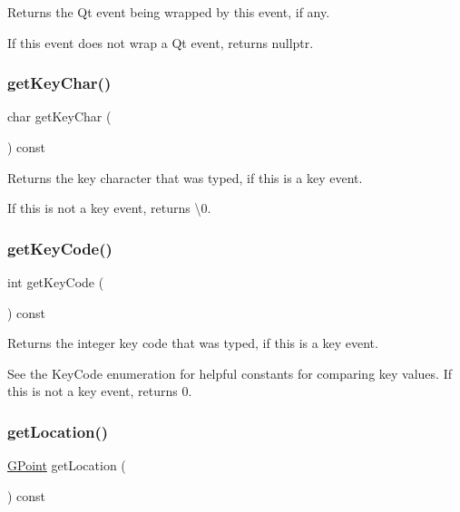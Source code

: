 Returns the Qt event being wrapped by this event, if any. 

If this event does not wrap a Qt event, returns nullptr. \mbox{\label{classGEvent_ab23396e09d92df320d2324b47a0766e8}} 
\subsubsection{\texorpdfstring{get\+Key\+Char()}{getKeyChar()}}
{\footnotesize\ttfamily char get\+Key\+Char (\begin{DoxyParamCaption}{ }\end{DoxyParamCaption}) const\hspace{0.3cm}{\ttfamily [virtual]}}



Returns the key character that was typed, if this is a key event. 

If this is not a key event, returns \textquotesingle{}\textbackslash{}0\textquotesingle{}. \mbox{\label{classGEvent_a71429f4b3c8f3c5097fe39e50501bbb6}} 
\subsubsection{\texorpdfstring{get\+Key\+Code()}{getKeyCode()}}
{\footnotesize\ttfamily int get\+Key\+Code (\begin{DoxyParamCaption}{ }\end{DoxyParamCaption}) const\hspace{0.3cm}{\ttfamily [virtual]}}



Returns the integer key code that was typed, if this is a key event. 

See the Key\+Code enumeration for helpful constants for comparing key values. If this is not a key event, returns 0. \mbox{\label{classGEvent_a4f83802015511edeb63b892830812c11}} 
\subsubsection{\texorpdfstring{get\+Location()}{getLocation()}}
{\footnotesize\ttfamily \mbox{\hyperlink{classGPoint}{G\+Point}} get\+Location (\begin{DoxyParamCaption}{ }\end{DoxyParamCaption}) const\hspace{0.3cm}{\ttfamily [virtual]}}



